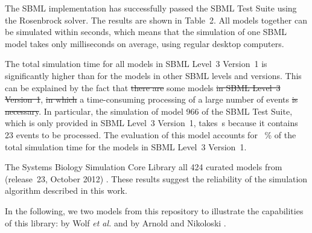 \documentclass[10pt]{bmc_article}
\newenvironment{bmcformat}{\fussy\setboolean{publ}{true}}{\fussy}
\begin{document}
\begin{bmcformat}
The  \acs{SBML} implementation has successfully passed the
SBML Test Suite  using the Rosenbrock solver.
The results are shown in Table~2.
All models together can be simulated within seconds, which means that the
simulation of one \acs{SBML} model takes only milliseconds on average, using
regular desktop computers.

The total simulation time for all models in \acs{SBML} Level~3 Version~1 is
significantly higher than for the models in other \acs{SBML} levels and
versions.
This can be explained by the fact that \sout{there are} some models
\sout{in \acs{SBML} Level~3 Version~1}, 
\sout{in which} 
a time-consuming processing of a large number of events\sout{ is necessary}.
In particular, the simulation of model \COR{\numero~}966 of the SBML Test Suite,
which is only provided in \acs{SBML} Level~3 Version~1, takes \,s 
because it contains 23 events to be processed.
The evaluation of this model accounts for ~\% of the total
simulation time for the models in \acs{SBML} Level~3 Version~1.

The Systems Biology Simulation Core Library 
all 424 curated models from 
(release~23, October 2012) .
These results suggest the reliability of the simulation algorithm described in
this work.

In the following, we  two models 
from this repository to illustrate the capabilities of this library:
 by Wolf \emph{et al.} \cite{Wolf2000}
and  by Arnold 
and Nikoloski \cite{Arnold2011}.


\end{bmcformat}
\end{document}
